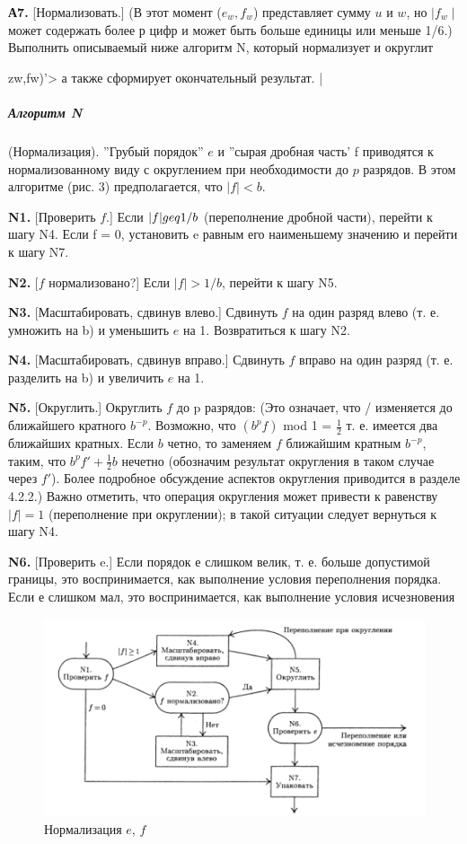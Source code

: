 \textbf{А7.} [Нормализовать.] (В этот момент ($e_w,f_w$) представляет сумму $u$ и $w$, но $\mid f_w\mid$ может содержать более р цифр и может быть больше единицы или меньше 1/6.) Выполнить описываемый ниже алгоритм N, который нормализует и округлит {zw,fw)'> а также сформирует окончательный результат. |

\subparagraph{Алгоритм N} (Нормализация). ''Грубый порядок'' $e$ и ''сырая дробная часть' f приводятся к нормализованному виду с округлением при необходимости до $p$ разрядов. В этом алгоритме (рис. 3) предполагается, что $|f| < b$.

\textbf{N1.} [Проверить $f$.] Если $|f| \\geq 1/b$ (переполнение дробной части), перейти к шагу N4. Если f = 0, установить e равным его наименьшему значению и перейти к шагу N7.

\textbf{N2.} [$f$ нормализовано?] Если $|f| > 1/b$, перейти к шагу N5.

\textbf{N3.} [Масштабировать, сдвинув влево.] Сдвинуть $f$ на один разряд влево (т. е. умножить на b) и уменьшить $e$ на 1. Возвратиться к шагу N2.

\textbf{N4.} [Масштабировать, сдвинув вправо.] Сдвинуть $f$ вправо на один разряд (т. е. разделить на b) и увеличить $e$ на 1.

\textbf{N5.} [Округлить.] Округлить $f$ до p разрядов: (Это означает, что / изменяется до ближайшего кратного $b^{-p}$. Возможно, что $(b^{p}f)$ mod 1 = $\frac{1}{2}$ т. е. имеется два ближайших кратных. Если $b$ четно, то заменяем $f$ ближайшим кратным $b^{-p}$, таким, что $b^{p}f' + \frac{1}{2}b$ нечетно (обозначим результат округления в таком случае через $f'$). Более подробное обсуждение аспектов округления приводится в разделе 4.2.2.) Важно отметить, что операция округления может привести к равенству $|f| = 1$ (переполнение при округлении); в такой ситуации следует вернуться к шагу N4.

\textbf{N6.} [Проверить e.] Если порядок $е$ слишком велик, т. е. больше допустимой границы, это воспринимается, как выполнение условия переполнения порядка. Если е слишком мал, это воспринимается, как выполнение условия исчезновения 
 
\begin{figure}

\begin{center}
\includegraphics[scale=.6]{s2}
\end{center}
\caption{Нормализация $e$, $f$}
\end{figure}

}
